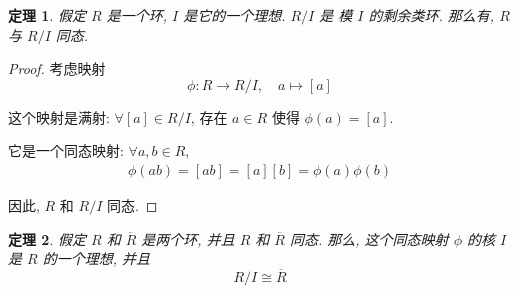 \documentclass[utf8]{ctexbook}
\newtheorem{theorem}{定理}[section]
\begin{document}
\begin{theorem}\label{thm_ring_quotient_ring}
假定 $R$ 是一个环, $I$ 是它的一个理想. $R/I$ 是 模 $I$ 的剩余类环. 那么有, $R$ 与 $R/I$ 同态. 
\end{theorem}

\begin{proof}
考虑映射
\begin{equation}
\phi : R \longrightarrow R/I, \quad  a \mapsto [a]
\end{equation}

这个映射是满射: $\forall [a] \in R/I $, 存在 $a\in R$ 使得 $\phi(a) = [a]$.

它是一个同态映射: $\forall a, b \in R$,
\begin{align*}
\phi(ab) = [ab] = [a][b] = \phi(a) \phi(b)
\end{align*}

因此, $R$ 和 $R/I$ 同态.

\end{proof}

\begin{theorem}\label{thm_ring_iso_quotient_ring}
假定 $R$ 和 $\overline{R}$ 是两个环, 并且 $R$ 和 $\overline{R}$ 同态. 那么, 这个同态映射 $\phi$ 的核 $I$ 是 $R$ 的一个理想, 并且
\begin{equation}
R/I \cong \overline{R}
\end{equation}
\end{theorem}
\end{document}
